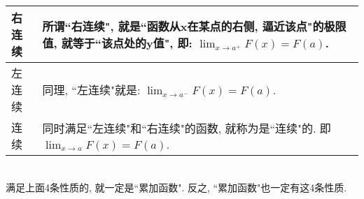 \documentclass[UTF8]{ctexart}
\begin{document}
	\begin{tabular}{|p{}|p{}|}
		\hline
		右连续 &  所谓``右连续", 就是``函数从x在某点的右侧, 逼近该点"的极限值, 就等于``该点处的y值", 即: $\lim_{x \to a^+} F(x) = F(a)$.\\
		\hline
		左连续 &  同理, ``左连续"就是: $\lim_{x \to a^-} F(x) = F(a)$.\\
		\hline
		连续 & 同时满足``左连续"和``右连续"的函数, 就称为是``连续"的. 即 $\lim_{x \to a} F(x) = F(a)$. \\
		\hline
	\end{tabular} \\
	
	满足上面4条性质的, 就一定是``累加函数". 反之, ``累加函数"也一定有这4条性质. \\	
	
	
	
	
	
	
	
\end{document}
